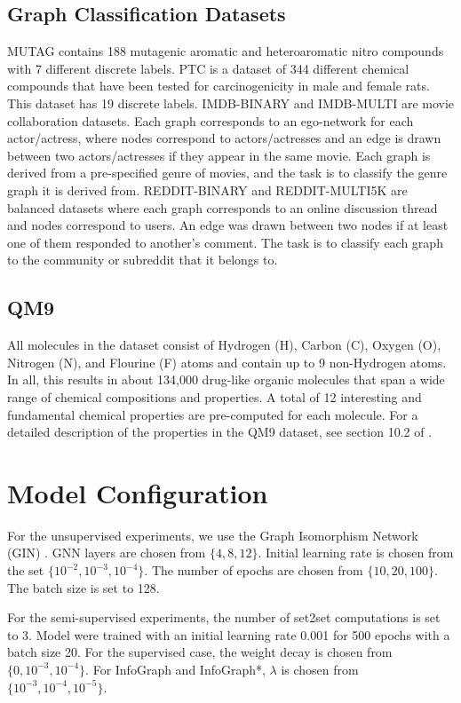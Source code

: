 \documentclass{article} \usepackage{iclr2020_conference,times}
\def\method{InfoGraph}
\begin{document}
\subsection{Graph Classification Datasets}
MUTAG contains 188 mutagenic aromatic and heteroaromatic nitro compounds with 7 different discrete labels. 
PTC is a dataset of 344 different chemical compounds that have been tested for carcinogenicity in male and female rats. This dataset has 19 discrete labels. IMDB-BINARY and IMDB-MULTI are movie collaboration datasets. Each graph corresponds to an ego-network for each actor/actress, where nodes correspond to actors/actresses and an edge is drawn between two actors/actresses if they appear in the same movie. Each graph is derived from a pre-specified genre of movies, and the task is to classify the genre graph it is derived from. REDDIT-BINARY and REDDIT-MULTI5K are balanced datasets where each graph corresponds to an online discussion thread and nodes correspond to users. An edge was drawn between two nodes if at least one of them responded to another’s comment. The task is to classify each graph to the community or subreddit that it belongs to.

\subsection{QM9}
All molecules in the dataset consist of Hydrogen (H), Carbon (C), Oxygen (O), Nitrogen (N), and Flourine (F) atoms and contain up to 9 non-Hydrogen atoms. In all, this results in about 134,000 drug-like organic molecules that span a wide range of chemical compositions and properties. A total of 12 interesting and fundamental chemical properties are pre-computed for each molecule. For a detailed description of the properties in the QM9 dataset, see section 10.2 of \cite{gilmer2017neural}.


\section{Model Configuration}
For the unsupervised experiments, we use the Graph Isomorphism Network (GIN) \cite{xu2018powerful}. GNN layers are chosen from $\{4, 8, 12\}$. Initial learning rate is chosen from the set $\{10^{-2}, 10^{-3}, 10^{-4}\}$. The number of epochs are chosen from $\{10, 20, 100\}$. The batch size is set to 128.

For the semi-supervised experiments, the number of set2set computations is set to 3. Model were trained with an initial learning rate 0.001 for 500 epochs with a batch size 20. For the supervised case, the weight decay is chosen from $\{0, 10^{-3}, 10^{-4}\}$. For \method{} and \method{}*, $\lambda$ is chosen from $\{10^{-3}, 10^{-4}, 10^{-5}\}$.
\end{document}
